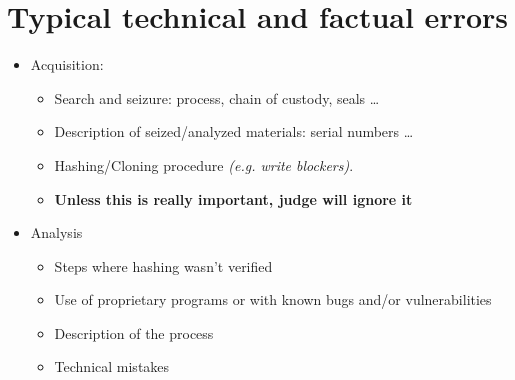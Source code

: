     \section{Typical technical and factual errors}
        \begin{itemize}
            \item Acquisition:
            \begin{itemize}
                \item Search and seizure: process, chain of custody, seals \dots 
                \item Description of seized/analyzed materials: serial numbers \dots
                \item Hashing/Cloning procedure \textit{(e.g. write blockers)}.
                \item \textbf{Unless this is really important, judge will ignore it}
            \end{itemize}
            \item Analysis 
            \begin{itemize}
                \item Steps where hashing wasn't verified
                \item Use of proprietary programs or with known bugs and/or vulnerabilities
                \item Description of the process
                \item Technical mistakes
            \end{itemize}
        \end{itemize}
